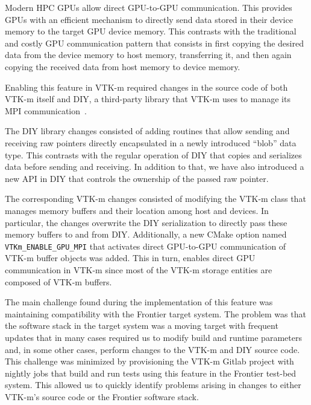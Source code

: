 Modern HPC GPUs allow direct GPU-to-GPU communication. This provides GPUs with an efficient mechanism to directly send data stored in their device memory to the target GPU device memory. This contrasts with the traditional and costly GPU communication pattern that consists in first copying the desired data from the device memory to host memory, transferring it, and then again copying the received data from host memory to device memory.

Enabling this feature in VTK-m required changes in the source code of both VTK-m itself and DIY, a third-party library that VTK-m uses to manage its MPI communication~\cite{Peterka2011,Morozov2016}.

The DIY library changes consisted of adding routines that allow sending and receiving raw pointers directly encapsulated in a newly introduced ``blob'' data type. This contrasts with the regular operation of DIY that copies and serializes data before sending and receiving. In addition to that, we have also introduced a new API in DIY that controls the ownership of the passed raw pointer.

The corresponding VTK-m changes consisted of modifying the VTK-m class that manages memory buffers and their location among host and devices.
In particular, the changes overwrite the DIY serialization to directly pass these memory buffers to and from DIY.
Additionally, a new CMake option named \texttt{VTKm\_ENABLE\_GPU\_MPI} that activates direct GPU-to-GPU communication of VTK-m buffer objects was added.
This in turn, enables direct GPU communication in VTK-m since most of the VTK-m storage entities are composed of VTK-m buffers. 

The main challenge found during the implementation of this feature was maintaining compatibility with the Frontier target system.
The problem was that the software stack in the target system was a moving target with frequent updates that in many cases required us to modify build and runtime parameters and, in some other cases, perform changes to the VTK-m and DIY source code.
This challenge was minimized by provisioning the VTK-m Gitlab project with nightly jobs that build and run tests using this feature in the Frontier test-bed system.
This allowed us to quickly identify problems arising in changes to either VTK-m's source code or the Frontier software stack.

